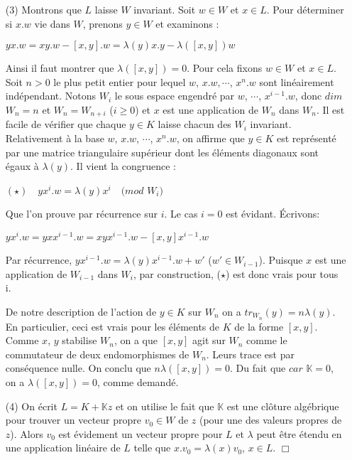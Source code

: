 \documentclass[a4paper,openany,12pt]{report}
\newcommand{\KK}{\mathbb{K}}
\theoremstyle{break}
{\theorembodyfont{\upshape}
\newtheorem*{rmq}{Remarque :}
\newtheorem*{prv}{Preuve :}
\newtheorem*{ex}{Exemples :}
\newtheorem*{exe}{Exemple : }
\newtheorem*{nota}{Notation :}
\newtheorem*{dem}{D\'emonstration :}}
\begin{document}
\begin{dem}
\begin{itemize}
\item[(3)] Montrons que $L$ laisse $W$ invariant. Soit $w \in W$ et $x \in L$. Pour déterminer si $x.w$ vie dans $W$, prenons $y \in W$ et examinons :
\begin{center}
$yx.w=xy.w-[x,y].w= \lambda(y)x.y- \lambda([x,y])w $
\end{center}
Ainsi il faut montrer que $\lambda([x,y])=0$. Pour cela fixons $w \in W$ et $x \in L$. Soit $n>0$ le plus petit entier pour lequel $w$, $x.w, \cdots$, $x^{n}.w$ sont linéairement indépendant. Notons $W_{i}$ le sous espace engendré par $w$, $\cdots$, $x^{i-1}.w$, donc $dim$ $W_{n}=n$ et $W_{n}=W_{n+i}$ ($i\geq 0$) et $x$ est une application de $W_{n}$ dans $W_{n}$. Il est facile de vérifier que chaque $y \in K$ laisse chacun des $W_{i}$ invariant. Relativement à la base $w$, $x.w$, $\cdots$, $x^{n}.w$, on affirme que $y \in K$ est représenté par une matrice triangulaire supérieur dont les éléments diagonaux sont égaux à $\lambda(y)$. Il vient la congruence :
\begin{center}
$(\star) \quad yx^{i}.w = \lambda(y)x^{i} \quad (mod$ $W_{i})$
\end{center}
Que l'on prouve par récurrence sur $i$. Le cas $i=0$ est évidant. Écrivons: 
\begin{center}
$yx^{i}.w = yxx^{i-1}.w = xyx^{i-1}.w -[x,y]x^{i-1}.w $
\end{center}
Par récurrence, $yx^{i-1}.w = \lambda(y)x^{i-1}.w+w'$ ($w' \in W_{i-1}$). Puisque $x$ est une application de $W_{i-1}$ dans $W_{i}$, par construction, ($\star$) est donc vrais pour tous i.

De notre description de l'action de $y \in K$ sur $W_{n}$ on a $tr_{W_{n}}(y)=n \lambda(y)$. En particulier, ceci est vrais pour les éléments de $K$ de la forme $[x,y]$. Comme $x$, $y$ stabilise $W_{n}$, on a que $[x,y]$ agit sur $W_{n}$ comme le commutateur de deux endomorphismes de $W_{n}$. Leurs trace est par conséquence nulle. On conclu que $n \lambda([x,y]) = 0$. Du fait que $car$ $\KK=0$, on a $\lambda([x,y])=0$, comme demandé.

\item[(4)] On écrit $L=K+ \KK z$ et on utilise le fait que $\KK$ est une clôture algébrique pour trouver un vecteur propre $v_{0} \in W$ de $z$ (pour une des valeurs propres de $z$). Alors $v_{0}$ est évidement un vecteur propre pour $L$ et $\lambda$ peut être étendu en une application linéaire de $L$ telle que $x.v_{0} = \lambda(x)v_{0}$, $x \in L$. $\Box$
\end{itemize}
\end{dem}
\end{document}
